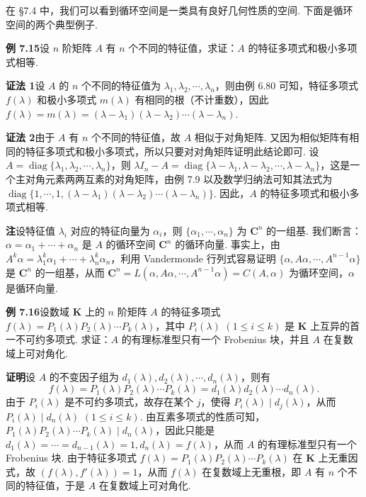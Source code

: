 \documentclass[UTF8,12pt,a4paper,fontset=fandol]{ctexart}
\begin{document}
在 §7.4 中，我们可以看到循环空间是一类具有良好几何性质的空间. 下面是循环空间的两个典型例子.

\noindent\textbf{例 7.15}\quad 设 $n$ 阶矩阵 $A$ 有 $n$ 个不同的特征值，求证：$A$ 的特征多项式和极小多项式相等.

\noindent\textbf{证法 1}\quad 设 $A$ 的 $n$ 个不同的特征值为 $\lambda_1,\lambda_2,\cdots,\lambda_n$，则由例 6.80 可知，特征多项式 $f(\lambda)$ 和极小多项式 $m(\lambda)$ 有相同的根（不计重数），因此 $f(\lambda)=m(\lambda)=(\lambda-\lambda_1)(\lambda-\lambda_2)\cdots(\lambda-\lambda_n)$.

\noindent\textbf{证法 2}\quad 由于 $A$ 有 $n$ 个不同的特征值，故 $A$ 相似于对角矩阵. 又因为相似矩阵有相同的特征多项式和极小多项式，所以只要对对角矩阵证明此结论即可. 设 $A=\operatorname{diag}\{\lambda_1,\lambda_2,\cdots,\lambda_n\}$，则 $\lambda I_n-A=\operatorname{diag}\{\lambda-\lambda_1,\lambda-\lambda_2,\cdots,\lambda-\lambda_n\}$，这是一个主对角元素两两互素的对角矩阵，由例 7.9 以及数学归纳法可知其法式为 $\operatorname{diag}\{1,\cdots,1,(\lambda-\lambda_1)(\lambda-\lambda_2)\cdots(\lambda-\lambda_n)\}$. 因此，$A$ 的特征多项式和极小多项式相等.

\noindent\textbf{注}\quad 设特征值 $\lambda_i$ 对应的特征向量为 $\alpha_i$，则 $\{\alpha_1,\cdots,\alpha_n\}$ 为 $\mathbf{C}^n$ 的一组基. 我们断言：$\alpha=\alpha_1+\cdots+\alpha_n$ 是 $A$ 的循环空间 $\mathbf{C}^n$ 的循环向量. 事实上，由 $A^k\alpha=\lambda_1^k\alpha_1+\cdots+\lambda_n^k\alpha_n$，利用 Vandermonde 行列式容易证明 $\{\alpha,A\alpha,\cdots,A^{n-1}\alpha\}$ 是 $\mathbf{C}^n$ 的一组基，从而 $\mathbf{C}^n=L(\alpha,A\alpha,\cdots,A^{n-1}\alpha)=C(A,\alpha)$ 为循环空间，$\alpha$ 是循环向量.

\noindent\textbf{例 7.16}\quad 设数域 $\mathbf{K}$ 上的 $n$ 阶矩阵 $A$ 的特征多项式 $f(\lambda)=P_1(\lambda)P_2(\lambda)\cdots P_k(\lambda)$，其中 $P_i(\lambda)$ $(1\le i\le k)$ 是 $\mathbf{K}$ 上互异的首一不可约多项式. 求证：$A$ 的有理标准型只有一个 Frobenius 块，并且 $A$ 在复数域上可对角化.

\noindent\textbf{证明}\quad 设 $A$ 的不变因子组为 $d_1(\lambda),d_2(\lambda),\cdots,d_n(\lambda)$，则有
\[
f(\lambda)=P_1(\lambda)P_2(\lambda)\cdots P_k(\lambda)=d_1(\lambda)d_2(\lambda)\cdots d_n(\lambda).
\]
由于 $P_i(\lambda)$ 是不可约多项式，故存在某个 $j$，使得 $P_i(\lambda)\mid d_j(\lambda)$，从而 $P_i(\lambda)\mid d_n(\lambda)$ $(1\le i\le k)$. 由互素多项式的性质可知，$P_1(\lambda)P_2(\lambda)\cdots P_k(\lambda)\mid d_n(\lambda)$，因此只能是 $d_1(\lambda)=\cdots=d_{n-1}(\lambda)=1,d_n(\lambda)=f(\lambda)$，从而 $A$ 的有理标准型只有一个 Frobenius 块. 由于特征多项式 $f(\lambda)=P_1(\lambda)P_2(\lambda)\cdots P_k(\lambda)$ 在 $\mathbf{K}$ 上无重因式，故 $(f(\lambda),f'(\lambda))=1$，从而 $f(\lambda)$ 在复数域上无重根，即 $A$ 有 $n$ 个不同的特征值，于是 $A$ 在复数域上可对角化.
\end{document}
